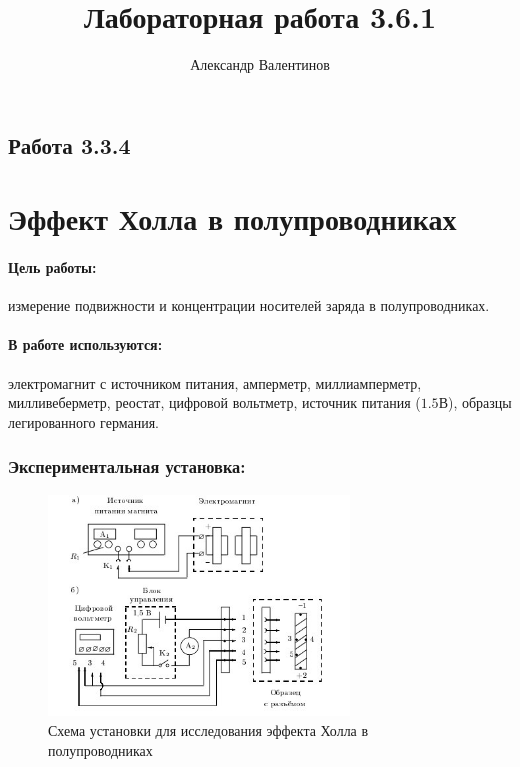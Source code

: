 \documentclass{article}
\author{Александр Валентинов}
\title{Лабораторная работа 3.6.1}
\begin{document}
   \subsection*{Работа 3.3.4}
   \section*{Эффект Холла в полупроводниках}
   
   \paragraph{Цель работы:} измерение подвижности и концентрации носителей заряда в полупроводниках.
   
   \paragraph{В работе используются:} электромагнит с источником питания, амперметр, миллиамперметр, милливеберметр, реостат, цифровой вольтметр, источник питания ($1.5$В), образцы легированного германия.
   
   \subsubsection*{Экспериментальная установка:}
   
   \begin{figure}[h]
   \centering
   \includegraphics[width=8cm]{3_3_4.jpg} 
   \caption{Схема установки для исследования эффекта Холла в полупроводниках} 
   \label{fig.1} 
   \end{figure}

   \vfill
   \pagebreak
\end{document}
